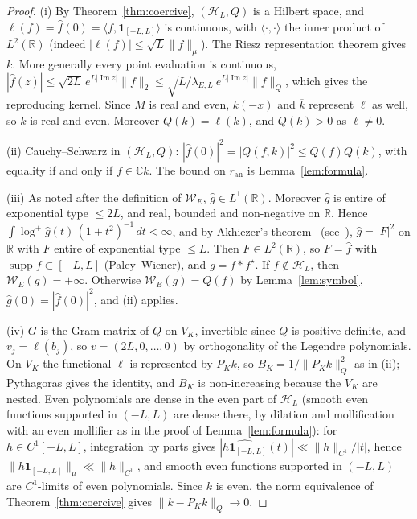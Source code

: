 \documentclass[11pt]{amsart}
\theoremstyle{remark}
\theoremstyle{definition}
\newcommand{\R}{\mathbb{R}}
\newcommand{\C}{\mathbb{C}}
\newcommand{\Hs}{\mathcal{H}_L}
\newcommand{\ran}{r_{\mathrm{an}}}
\DeclareMathOperator{\supp}{supp}
\begin{document}
\begin{proof}
(i) By Theorem~\ref{thm:coercive}, $(\Hs,Q)$ is a Hilbert space, and $\ell(f)=\hat f(0)=\langle f,\mathbf 1_{[-L,L]}\rangle$
is continuous, with $\langle\cdot,\cdot\rangle$ the inner product of $L^2(\R)$ (indeed $|\ell(f)|\le\sqrt L\|f\|_\mu$). The Riesz representation theorem gives $k$. More generally every point evaluation is continuous, $|\hat f(z)|\le\sqrt{2L}\,e^{L|\operatorname{Im}z|}\|f\|_2\le\sqrt{L/\lambda_{E,L}}\,e^{L|\operatorname{Im}z|}\|f\|_Q$, which gives the reproducing kernel. Since $M$ is real and even, $k(-x)$ and
$\overline{k}$ represent $\ell$ as well, so $k$ is real and even. Moreover $Q(k)=\ell(k)$, and $Q(k)>0$ as $\ell\ne0$.

(ii) Cauchy--Schwarz in $(\Hs,Q)$: $|\hat f(0)|^2=|Q(f,k)|^2\le Q(f)Q(k)$, with equality if and only if $f\in\C k$. The bound on
$\ran$ is Lemma~\ref{lem:formula}.

(iii) As noted after the definition of $\mathcal W_E$, $\hat g\in L^1(\R)$. Moreover $\hat g$ is entire of exponential type $\le2L$,
and real, bounded and non-negative on $\R$. Hence $\int\log^+\hat g(t)\,(1+t^2)^{-1}\,dt<\infty$, and by Akhiezer's theorem~\cite{Akhiezer} (see~\cite[pp.~124--132]{Boas}), $\hat g=|F|^2$ on $\R$ with $F$ entire of exponential
type $\le L$. Then $F\in L^2(\R)$, so $F=\hat f$ with $\supp f\subset[-L,L]$ (Paley--Wiener), and $g=f*f^\star$. If
$f\notin\Hs$, then $\mathcal W_E(g)=+\infty$. Otherwise $\mathcal W_E(g)=Q(f)$ by Lemma~\ref{lem:symbol}, $\hat g(0)=|\hat f(0)|^2$, and (ii)
applies.

(iv) $G$ is the Gram matrix of $Q$ on $V_K$, invertible since $Q$ is positive definite, and $v_j=\ell(b_j)$, so $v=(2L,0,\dots,0)$ by orthogonality of the Legendre polynomials. On $V_K$ the functional $\ell$ is represented by $P_Kk$, so $B_K=1/\|P_Kk\|_Q^2$ as in (ii); Pythagoras gives
the identity, and $B_K$ is non-increasing because the $V_K$ are nested. Even polynomials are dense in the even part of $\Hs$ (smooth even functions supported in $(-L,L)$ are dense there, by dilation and mollification with an even mollifier as in the proof of Lemma~\ref{lem:formula}): for $h\in C^1[-L,L]$, integration by parts gives $|\widehat{h\mathbf 1_{[-L,L]}}(t)|\ll\|h\|_{C^1}/|t|$, hence
$\|h\mathbf 1_{[-L,L]}\|_\mu\ll\|h\|_{C^1}$, and smooth even functions supported in $(-L,L)$ are $C^1$-limits of
even polynomials. Since $k$ is even, the norm equivalence of Theorem~\ref{thm:coercive} gives $\|k-P_Kk\|_Q\to0$.
\end{proof}
\end{document}
